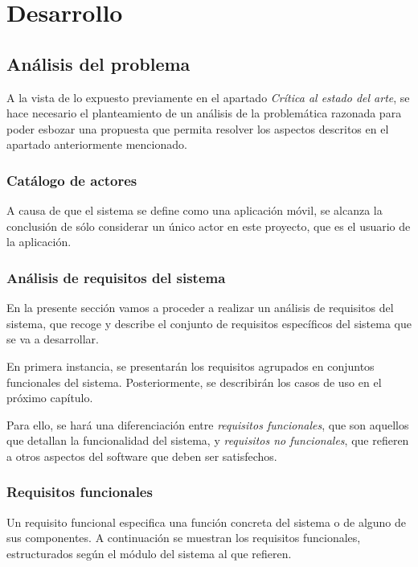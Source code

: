 


\part{Desarrollo}
\chapter{Análisis del problema}
A la vista de lo expuesto previamente en el apartado 
\textit{Crítica al estado del arte}, se hace necesario el 
planteamiento de un análisis de la problemática razonada para 
poder esbozar una propuesta que permita resolver los aspectos 
descritos en el apartado anteriormente mencionado.\medskip

\section{Catálogo de actores}
A causa de que el sistema se define como una aplicación móvil, 
se alcanza la conclusión de sólo considerar un único actor en 
este proyecto, que es el usuario de la aplicación.

\section{Análisis de requisitos del sistema}
En la presente sección vamos a proceder a realizar un análisis de 
requisitos del sistema, que recoge y describe el conjunto 
de requisitos específicos del sistema que se va a desarrollar.\medskip

En primera instancia, se presentarán los requisitos agrupados en 
conjuntos funcionales del sistema. Posteriormente, se describirán 
los casos de uso en el próximo capítulo. \medskip

Para ello, se hará una diferenciación entre 
\textit{requisitos funcionales}, que son aquellos que detallan 
la funcionalidad del sistema, y \textit{requisitos no funcionales},
que refieren a otros aspectos del software que deben ser satisfechos.

\section{Requisitos funcionales}
Un requisito funcional especifica una función concreta del sistema o 
de alguno de sus componentes. A continuación se muestran los requisitos 
funcionales, estructurados según el módulo del sistema al que refieren.
        
